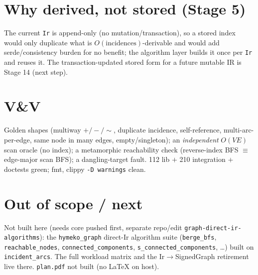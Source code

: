 \documentclass[11pt]{article}
\begin{document}
\section*{Why derived, not stored (Stage 5)}
The current \texttt{Ir} is append-only (no mutation/transaction), so a stored
index would only duplicate what is $O(\text{incidences})$-derivable and would add
serde/consistency burden for no benefit; the algorithm layer builds it once per
\texttt{Ir} and reuses it. The transaction-updated stored form for a future
mutable IR is Stage 14 (next step).

\section*{V\&V}
Golden shapes (multiway $+/-/\sim$, duplicate incidence, self-reference,
multi-arc-per-edge, same node in many edges, empty/singleton); an
\emph{independent} $O(VE)$ scan oracle (no index); a metamorphic reachability
check (reverse-index BFS $\equiv$ edge-major scan BFS); a dangling-target fault.
112 lib $+$ 210 integration $+$ doctests green; fmt, clippy \texttt{-D warnings}
clean.

\section*{Out of scope / next}
Not built here (needs core pushed first, separate repo/edit
\texttt{graph-direct-ir-algorithms}): the \texttt{hymeko\_graph} direct-Ir
algorithm suite (\texttt{berge\_bfs}, \texttt{reachable\_nodes},
\texttt{connected\_components}, \texttt{s\_connected\_components}, \dots) built on
\texttt{incident\_arcs}. The full workload matrix and the Ir$\to$SignedGraph
retirement live there. \texttt{plan.pdf} not built (no LaTeX on host).
\end{document}
